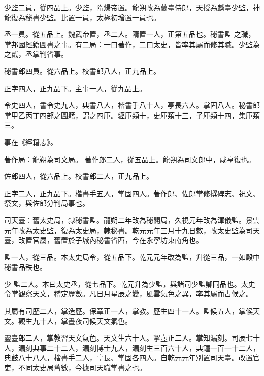 \begin{pinyinscope}
 少監二員，從四品上。少監，隋煬帝置。龍朔改為蘭臺侍郎，天授為麟臺少監，神龍復為秘書少監。比置一員，太極初增置一員也。



 丞一員。從五品上。魏武帝置，丞二人。隋置一人，正第五品也。秘書監
 之職，掌邦國經籍圖書之事。有二局：一曰著作，二曰太史，皆率其屬而修其職。少監為之貳，丞掌判省事。



 秘書郎四員。從六品上。校書郎八人，正九品上。



 正字四人，正九品下。主事一人，從九品上。



 令史四人，書令史九人，典書八人，楷書手八十人，亭長六人。掌固八人。秘書郎掌甲乙丙丁四部之圖籍，謂之四庫。經庫類十，史庫類十三，子庫類十四，集庫類三。



 事在《經籍志》。



 著作局：龍朔為司文局。
 著作郎二人，從五品上。龍朔為司文郎中，咸亨復也。



 佐郎四人，從六品上。校書郎二人，正九品上。



 正字二人，正九品下。楷書手五人，掌固四人。著作郎、佐郎掌修撰碑志、祝文、祭文，與佐郎分判局事也。



 司天臺：舊太史局，隸秘書監。龍朔二年改為秘閣局，久視元年改為渾儀監。景雲元年改為太史監，復為太史局，隸秘書。乾元元年三月十九日敕，改太史監為司天臺，改置官屬，舊置於子城內秘書省西，今在永寧坊東南角也。



 監一人，從三品。本太史局令，從五品下。乾元元年改為監，升從三品，一如殿中秘書品秩也。



 少
 監二人。本曰太史丞，從七品下。乾元升為少監，與諸司少監卿同品也。太史令掌觀察天文，稽定歷數。凡日月星辰之變，風雲氣色之異，率其屬而占候之。



 其屬有司歷二人，掌造歷。保章正一人，掌教。歷生四十一人。監候五人，掌候天文。觀生九十人，掌晝夜司候天文氣色。



 靈臺郎二人，掌教習天文氣色。天文生六十人。挈壺正二人。掌知漏刻。司辰七十人，漏刻典事二十二人，漏刻博士九人，漏刻生三百六十人，典鐘一百一十二人，典鼓八十八人，楷書手二人，亭長、掌固各四人。自乾元元年別置司天臺。改置官吏，不同太史局舊數，今據司天職掌書之也。




\end{pinyinscope}
